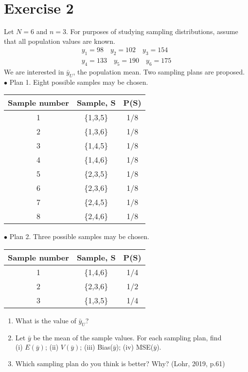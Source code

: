 \documentclass[12pt]{article}
\begin{document}
\section*{Exercise 2}
Let $N=6$ and $n=3$. For purposes of studying sampling distributions, assume that all
population values are known. 
\begin{eqnarray*}
y_1=98 \quad y_2=102 \quad y_3=154 \\
y_4=133 \quad y_5=190 \quad y_6=175
\end{eqnarray*}
We are interested in $\bar{y}_U$, the population mean. Two sampling plans are proposed.\\
$\bullet$ Plan 1. Eight possible samples may be chosen.
\begin{center}
\begin{tabular}{ccc}
Sample number & Sample, S & P(S)\\
\hline
1 &\{1,3,5\}& 1/8\\
2 &\{1,3,6\}& 1/8\\
3 &\{1,4,5\}& 1/8\\
4 &\{1,4,6\}& 1/8\\
5 &\{2,3,5\}& 1/8\\
6 &\{2,3,6\}& 1/8\\
7 &\{2,4,5\}& 1/8\\
8 &\{2,4,6\}& 1/8\\
\end{tabular}
\end{center}
$\bullet$ Plan 2. Three possible samples may be chosen.

\begin{center}
\begin{tabular}{ccc}
Sample number & Sample, S & P(S)\\
\hline
1 &\{1,4,6\}& 1/4\\
2 &\{2,3,6\}& 1/2\\
3 &\{1,3,5\}& 1/4\\
\end{tabular}
\end{center}

\begin{enumerate}
\item What is the value of $\bar{y}_U$?
\item Let $\bar{y}$ be the mean of the sample values. For each sampling plan, find \\
(i) $E(\bar{y})$; (ii) $V(\bar{y})$; (iii) Bias($\bar{y}$); (iv) MSE($\bar{y}$).
\item Which sampling plan do you think is better? Why? \hfill (Lohr, 2019, p.61)
\end{enumerate}
\end{document}
